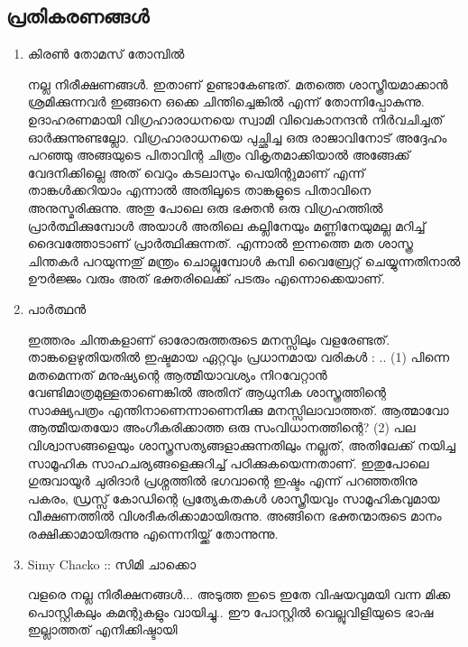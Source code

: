 \subsection*{പ്രതികരണങ്ങള്‍}
\begin{enumerate}
 \item{കിരണ്‍ തോമസ് തോമ്പില്‍}

നല്ല നിരീക്ഷണങ്ങള്‍. ഇതാണ്‌ ഉണ്ടാകേണ്ടത്‌. മതത്തെ ശാസ്ത്രീയമാക്കാന്‍ ശ്രമിക്കുന്നവര്‍ ഇങ്ങനെ ഒക്കെ ചിന്തിച്ചെങ്കില്‍ 
എന്ന് തോന്നിപ്പോകുന്നു. ഉദാഹരണമായി വിഗ്രഹാരാധനയെ സ്വാമി വിവെകാനന്ദന്‍ നിര്‍വചിച്ചത്‌ ഓര്‍ക്കുന്നുണ്ടല്ലോ. 
വിഗ്രഹാരാധനയെ പുച്ഛിച്ച ഒരു രാജാവിനോട്‌ അദ്ദേഹം പറഞ്ഞു അങ്ങയുടെ പിതാവിന്റ ചിത്രം വികൃതമാക്കിയാല്‍ 
അങ്ങേക്ക്‌ വേദനിക്കില്ലെ അത്‌ വെറും കടലാസും പെയിന്റുമാണ്‌ എന്ന് താങ്കള്‍ക്കറിയാം എന്നാല്‍ അതിലൂടെ താങ്കളുടെ 
പിതാവിനെ അനുസ്മരിക്കുന്നു. അതു പോലെ ഒരു ഭക്തന്‍ ഒരു വിഗ്രഹത്തില്‍ പ്രാര്‍ത്ഥിക്കുമ്പോള്‍ അയാള്‍ അതിലെ 
കല്ലിനേയും മണ്ണിനേയുമല്ല മറിച്ച്‌ ദൈവത്തോടാണ്‌ പ്രാര്‍ത്ഥിക്കുന്നത്‌. എന്നാല്‍ ഇന്നത്തെ മത ശാസ്ത്ര ചിന്തകര്‍ പറയുന്നതു് 
മന്ത്രം ചൊല്ലുമ്പോള്‍ കമ്പി വൈബ്രേറ്റ്‌ ചെയ്യുന്നതിനാല്‍ ഊര്‍ജ്ജം വരും അത്‌ ഭക്തരിലെക്ക്‌ പടരും എന്നൊക്കെയാണ്‌.

 \item{പാര്‍ത്ഥന്‍}

    ഇത്തരം ചിന്തകളാണ്‌ ഓരോരുത്തരുടെ മനസ്സിലും വളരേണ്ടത്‌. താങ്കളെഴുതിയതില്‍ ഇഷ്ടമായ ഏറ്റവും പ്രധാനമായ വരികള്‍ : .. (1) പിന്നെ മതമെന്നത് മനുഷ്യന്റെ ആത്മീയാവശ്യം നിറവേറ്റാന്‍ വേണ്ടിമാത്രമുള്ളതാണെങ്കില്‍ അതിന് ആധുനിക ശാസ്ത്രത്തിന്റെ സാക്ഷ്യപത്രം എന്തിനാണെന്നാണെനിക്കു മനസ്സിലാവാത്തത്. ആത്മാവോ ആത്മീയതയോ അംഗീകരിക്കാത്ത ഒരു സംവിധാനത്തിന്റെ? (2) പല വിശ്വാസങ്ങളെയും ശാസ്ത്രസത്യങ്ങളാക്കുന്നതിലും നല്ലത്, അതിലേക്ക് നയിച്ച സാമൂഹിക സാഹചര്യങ്ങളെക്കുറിച്ച് പഠിക്കുകയെന്നതാണ്. ഇതുപോലെ ഗുരുവായൂര്‍ ചുരിദാര്‍ പ്രശ്നത്തില്‍ ഭഗവാന്റെ ഇഷ്ടം എന്ന് പറഞ്ഞതിനു പകരം, ഡ്രസ്സ്‌ കോഡിന്റെ പ്രത്യേകതകള്‍ ശാസ്ത്രീയവും സാമൂഹികവുമായ വീക്ഷണത്തില്‍ വിശദീകരിക്കാമായിരുന്നു. അങ്ങിനെ ഭക്തന്മാരുടെ മാനം രക്ഷിക്കാമായിരുന്നു എന്നെനിയ്ക്ക്‌ തോന്നുന്നു.
 
  \item{Simy Chacko :: സിമി ചാക്കൊ}

    വളരെ നല്ല നിരീക്ഷനങ്ങള്‍... അടുത്ത ഇടെ ഇതേ വിഷയവുമയി വന്ന മിക്ക പൊസ്റ്റികലും കമന്റുകളും വായിച്ചു.. 
ഈ പോസ്റ്റില്‍ വെല്ലുവിളിയുടെ ഭാഷ ഇല്ലാത്തത് എനിക്കിഷ്ടായി
    
\end{enumerate}

\newpage
